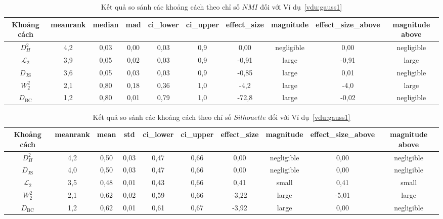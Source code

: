 \documentclass[a4paper,oneside]{book} %
\theoremstyle{plain}
\theoremstyle{plain}
\theoremstyle{nonumberplain}
\begin{document}
\begin{spacing}{1.0}
\begin{landscape}
	
	\begin{table}[H]
		\centering
		\fontsize{11pt}{14pt}\selectfont
		\caption{Kết quả so sánh các khoảng cách theo chỉ số $NMI$ đối với Ví dụ~\ref{vdu:gauss1}}
		\begin{tabular}{cccccccccc}
			\toprule
			Khoảng cách & meanrank & median & mad & ci\_lower & ci\_upper & effect\_size & magnitude & effect\_size\_above & magnitude above \\
			\midrule
			$D^2_{H}$                 & 4{,}2 & 0{,}03 & 0{,}00 & 0{,}03 & 0{,}9  &  0{,}00 & negligible &  0{,}00 & negligible \\
			$\mathcal{L}_2$         & 3{,}9 & 0{,}05 & 0{,}02 & 0{,}03 & 0{,}9  & -0{,}91 & large      & -0{,}91 & large \\
			$D_{\mathrm{JS}}$       & 3{,}6 & 0{,}05 & 0{,}03 & 0{,}03 & 0{,}9  & -0{,}85 & large      &  0{,}01 & negligible \\
			$W^2_2$                 & 2{,}1 & 0{,}80 & 0{,}18 & 0{,}36 & 1{,}0  & -4{,}2  & large      & -4{,}0  & large \\
			$D_{\mathrm{BC}}$       & 1{,}2 & 0{,}80 & 0{,}01 & 0{,}79 & 1{,}0  & -72{,}8 & large      & -0{,}02 & negligible \\
			\bottomrule
		\end{tabular}
	\end{table}
	
	
	\begin{table}[H]
		\centering
		\fontsize{11pt}{14pt}\selectfont
		\caption{Kết quả so sánh các khoảng cách theo chỉ số $Silhouette$ đối với Ví dụ~\ref{vdu:gauss1}}
		\begin{tabular}{cccccccccc}
			\toprule
			{Khoảng cách} & meanrank & mean & std & ci\_lower & ci\_upper & effect\_size & magnitude & effect\_size\_above & magnitude above \\
			\midrule
			$D^2_{H}$                 & 4{,}2 & 0{,}50 & 0{,}03 & 0{,}47 & 0{,}66 &  0{,}00 & negligible &  0{,}00 & negligible \\
			$D_{\mathrm{JS}}$       & 4{,}0 & 0{,}50 & 0{,}03 & 0{,}47 & 0{,}66 &  0{,}00 & negligible &  0{,}00 & negligible \\
			$\mathcal{L}_2$         & 3{,}5 & 0{,}48 & 0{,}01 & 0{,}43 & 0{,}66 &  0{,}41 & small      &  0{,}41 & small \\
			$W^2_2$                 & 2{,}1 & 0{,}62 & 0{,}02 & 0{,}59 & 0{,}66 & -3{,}22 & large      & -5{,}01 & large \\
			$D_{\mathrm{BC}}$       & 1{,}2 & 0{,}62 & 0{,}01 & 0{,}61 & 0{,}67 & -3{,}92 & large      &  0{,}00 & negligible \\
			\bottomrule
		\end{tabular}
	\end{table}
	

\end{landscape}
\end{spacing}
\end{document}
